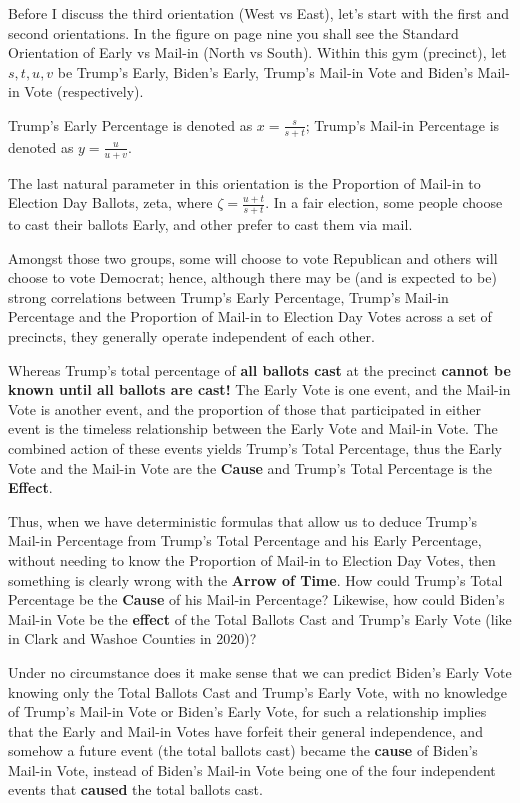\documentclass[preprint,13pt]{elsarticle}
\begin{document}
Before I discuss the third orientation (West vs East), let's start with the first and second orientations. In the figure on page nine you shall see the Standard Orientation of Early vs Mail-in (North vs South). Within this gym (precinct), let $s,t,u,v$ be Trump's Early, Biden's Early, Trump's Mail-in Vote and Biden's Mail-in Vote (respectively).

Trump's Early Percentage is denoted as $x=\frac{s}{s+t}$; Trump's Mail-in Percentage is denoted as $y=\frac{u}{u+v}$.

The last natural parameter in this orientation is the Proportion of Mail-in to Election Day Ballots, zeta, where $\zeta=\frac{u+t}{s+t}$. In a fair election, some people choose to cast their ballots Early, and other prefer to cast them via mail. 

Amongst those two groups, some will choose to vote Republican and others will choose to vote Democrat; hence, although there may be (and is expected to be) strong correlations between Trump's Early Percentage, Trump's Mail-in Percentage and the Proportion of Mail-in to Election Day Votes across a set of precincts, they generally operate independent of each other.

Whereas Trump's total percentage of \textbf{all ballots cast} at the precinct \textbf{cannot be known until all ballots are cast!} The Early Vote is one event, and the Mail-in Vote is another event, and the proportion of those that participated in either event is the timeless relationship between the Early Vote and Mail-in Vote. The combined action of these events yields Trump's Total Percentage, thus the Early Vote and the Mail-in Vote are the \textbf{Cause} and Trump's Total Percentage is the \textbf{Effect}.

Thus, when we have deterministic formulas that allow us to deduce Trump's Mail-in Percentage from Trump's Total Percentage and his Early Percentage, without needing to know the Proportion of Mail-in to Election Day Votes, then something is clearly wrong with the \textbf{Arrow of Time}.  How could Trump's Total Percentage be the \textbf{Cause} of his Mail-in Percentage?
\newpage
Likewise, how could Biden's Mail-in Vote be the \textbf{effect} of the Total Ballots Cast and Trump's Early Vote (like in Clark and Washoe Counties in 2020)?

Under no circumstance does it make sense that we can predict Biden's Early Vote knowing only the Total Ballots Cast and Trump's Early Vote, with no knowledge of Trump's Mail-in Vote or Biden's Early Vote, for such a relationship implies that the Early and Mail-in Votes have forfeit their general independence, and somehow a future event (the total ballots cast) became the \textbf{cause} of Biden's Mail-in Vote, instead of Biden's Mail-in Vote being one of the four independent events that \textbf{caused} the total ballots cast.
\end{document}
